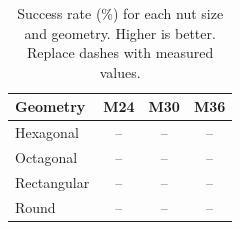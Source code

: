 \begin{table}[htbp]
  \caption{Success rate (\%) for each nut size and geometry. Higher is better.
    Replace dashes with measured values.}
  \label{tab:success_rate}
  \centering
  \begin{tabular}{lccc}
    \toprule
    Geometry & M24 & M30 & M36 \\
    \midrule
    Hexagonal  & -- & -- & -- \\
    Octagonal  & -- & -- & -- \\
    Rectangular & -- & -- & -- \\
    Round      & -- & -- & -- \\
    \bottomrule
  \end{tabular}
\end{table}

